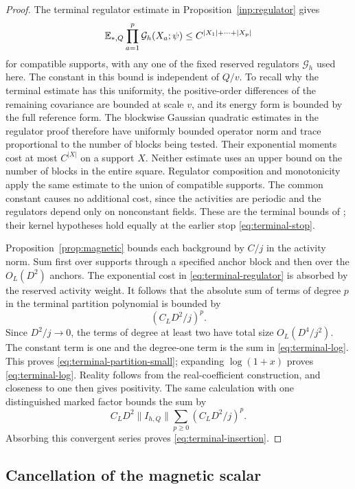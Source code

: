 \begin{proof}
The terminal regulator estimate in Proposition~\ref{inp:regulator} gives
\begin{equation}
 \mathbb E_{*,Q}\prod_{a=1}^p\mathcal G_h(X_a;\psi)
 \leq C^{|X_1|+\cdots+|X_p|}
 \label{eq:terminal-regulator}
\end{equation}
for compatible supports, with any one of the fixed reserved regulators
$\mathcal G_h$ used here.  The constant in this bound is independent of
$Q/v$.  To recall why the terminal estimate has this uniformity, the
positive-order differences of the remaining covariance are bounded at
scale $v$, and its energy form is bounded by the full reference form.
The blockwise Gaussian quadratic estimates in the regulator proof
therefore have uniformly bounded operator norm and trace proportional
to the number of blocks being tested.  Their exponential moments cost
at most $C^{|X|}$ on a support $X$.  Neither estimate uses an upper
bound on the number of blocks in the entire square.  Regulator
composition and monotonicity apply the same estimate to the union of
compatible supports.  The common constant causes no additional cost,
since the activities are periodic and the regulators depend only on
nonconstant fields.  These are the terminal bounds of
\cite[Sections 9 and 4]{B}; their
kernel hypotheses hold equally at the earlier stop
\eqref{eq:terminal-stop}.

Proposition~\ref{prop:magnetic} bounds each background by $C/j$ in the
activity norm.  Sum first over supports through a specified anchor
block and then over the $O_L(D^2)$ anchors.  The exponential cost in
\eqref{eq:terminal-regulator} is absorbed by the reserved activity
weight.  It follows that the absolute sum of terms of degree $p$ in
the terminal partition polynomial is bounded by
\[
                    (C_LD^2/j)^p.
\]
Since $D^2/j\to0$, the terms of degree at least two have total size
$O_L(D^4/j^2)$.  The constant term is one and the degree-one term is
the sum in \eqref{eq:terminal-log}.  This proves
\eqref{eq:terminal-partition-small}; expanding $\log(1+x)$ proves
\eqref{eq:terminal-log}.  Reality follows from the real-coefficient
construction, and closeness to one then gives positivity.  The same
calculation with one distinguished marked factor bounds the sum by
\[
 C_LD^2\|I_{h,Q}\|
       \sum_{p\geq0}(C_LD^2/j)^p.
\]
Absorbing this convergent series proves
\eqref{eq:terminal-insertion}.
\end{proof}

\subsection{Cancellation of the magnetic scalar}

